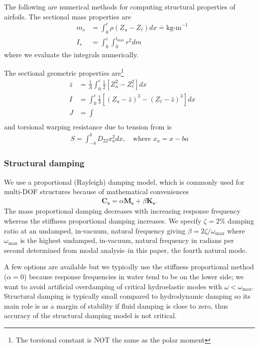 \documentclass[10pt]{article}
\newcommand{\mbf}[1]{\mathbf{#1}}
\newcommand{\be}{\begin{eqnarray}}
\newcommand{\ee}{\end{eqnarray}}
\newcommand{\ben}{\begin{eqnarray*}}
\newcommand{\een}{\end{eqnarray*}}
\newcommand{\tn}[1]{\textrm{#1}}
\begin{document}
The following are numerical methods for computing structural properties of airfoils.
The sectional mass properties are
\be
& m_s & = \int_{0}^{c} \rho \left(Z_u - Z_\ell \right)  dx \doteq \tn{kg-m}^{-1}
\\
& I_s & = \int_{0}^{c}\int_{0}^{t_{\tn{max}}} r^2 dm
\ee
where we evaluate the integrals numerically.

The sectional geometric properties are\footnote{The torsional constant is NOT the same as the polar moment}
\be
& \bar{z} & =\frac{1}{A} \int_0^c \frac{1}{2}\left[Z_u^2-Z_{\ell}^2\right] d x \\
& I & =\int_0^c \frac{1}{3}\left[\left(Z_u-\bar{z}\right)^3-\left(Z_{\ell}-\bar{z}\right)^3\right] d x \\
& J &= \int \\
\ee
and torsional warping resistance due to tension from \citet{LOTTATI1985} is
\be
S = \int_{-b}^b D_{22} x_a^2 d x, \quad\tn{where } x_a = x - ba
\ee
\subsubsection{Structural damping}
% 
We use a proportional (Rayleigh) damping model, which is commonly used for multi-DOF structures because of mathematical conveniences
\ben
\mbf{C_s} = \alpha \mbf{M_s} + \beta \mbf{K_s}.
\een
The mass proportional damping decreases with increasing response frequency whereas the stiffness proportional damping increases.
We specify $\zeta = 2\%$ damping ratio at an undamped, in-vacuum, natural frequency giving
$\beta = {2 \zeta}/{\omega_{\tn{max}}}$
where $\omega_{\tn{max}}$ is the highest undamped, in-vacuum, natural frequency in radians per second determined from modal analysis--in this paper, the fourth natural mode.

A few options are available but we typically use the stiffness proportional method ($\alpha=0$) because response frequencies in water tend to be on the lower side;
we want to avoid artificial overdamping of critical hydroelastic modes with $\omega < \omega_{\tn{max}}$.
Structural damping is typically small compared to hydrodynamic damping so its main role is as a margin of stability if fluid damping is close to zero, thus accuracy of the structural damping model is not critical.
% 
\end{document}
